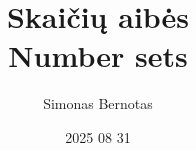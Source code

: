 \title{Skaičių aibės\\[0.25em]\normalsize Number sets}
\subtitle{}
\author{Simonas Bernotas}
\date{2025 08 31}

